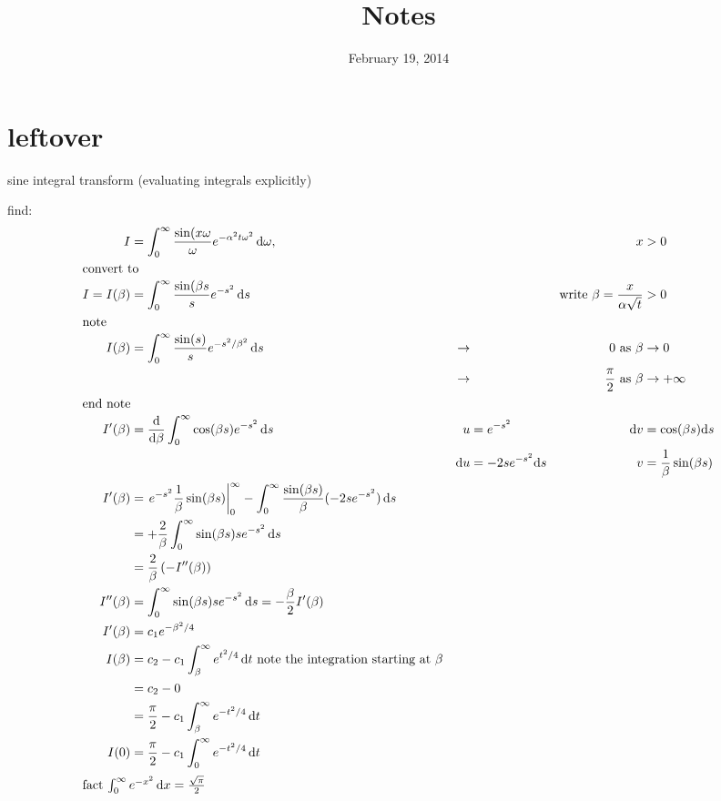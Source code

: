 \documentclass{article}
\begin{document}
\title{Notes}
\date{February 19, 2014}
\maketitle

\section*{leftover}
sine integral transform (evaluating integrals explicitly)

find:
\begin{align*}
  I&=\int_0^\infty{\frac{\sin(x\omega }{\omega }e^{-\alpha ^2t\omega ^2}\,\mathrm{d}\omega },& &&x&>0\\
  \intertext{convert to}
  I=I(\beta )&=\int_0^\infty{\frac{\sin(\beta s}{s}e^{-s^2}\,\mathrm{d}s}&&&\text{write }\beta =\frac{x}{\alpha \sqrt{t}}&>0\\
  \intertext{note}
  I(\beta )&=\int_0^\infty{\frac{\sin(s)}{s}e^{-s^2/\beta ^2}\,\mathrm{d}s}
  &\to&& 0 \text{ as }\beta &\to 0\\
  &&\to&&\frac{\pi }{2}\text{ as }\beta &\to+\infty\\
  \intertext{end note}
  I'(\beta )&=\frac{\mathrm{d}}{\mathrm{d}\beta }\int_0^\infty{\cos(\beta s)e^{-s^2}\,\mathrm{d}s}&u&=e^{-s^2}&\mathrm{d}v&=\cos(\beta s)\mathrm{d}s\\
  &&\mathrm{d}u&=-2se^{-s^2}\mathrm{d}s&v&=\frac{1}{\beta }\sin(\beta s)\\
  I'(\beta )&=\left.e^{-s^2}\frac{1}{\beta }\sin(\beta s)\right\rvert_0^\infty-\int_0^\infty{\frac{\sin(\beta s)}{\beta }(-2se^{-s^2})\,\mathrm{d}s}\\
  &=+\frac{2}{\beta }\int_0^\infty{\sin(\beta s)se^{-s^2}\,\mathrm{d}s}\\
  &=\frac{2}{\beta }\left(-I''(\beta )\right)\\
  I''(\beta )&=\int_0^\infty{\sin(\beta s)se^{-s^2}\,\mathrm{d}s}=-\frac{\beta }{2}I'(\beta )\\
  I'(\beta )&=c_1e^{-\beta^2 /4}\\
  I(\beta )&=c_2-c_1\int_\beta^\infty{e^{t^2/4}\,\mathrm{d}t}\text{ note the integration starting at }\beta \\
  &=c_2-0\\
  &=\frac{\pi }{2}-c_1\int_\beta^\infty{e^{-t^2/4}\,\mathrm{d}t}\\
  I(0)&=\frac{\pi }{2}-c_1\int_0^\infty{e^{-t^2/4}\,\mathrm{d}t}\\
  \intertext{fact $\int_0^\infty{e^{-x^2}\,\mathrm{d}x}=\frac{\sqrt{\pi }}{2}$}

\end{align*}
\end{document}
